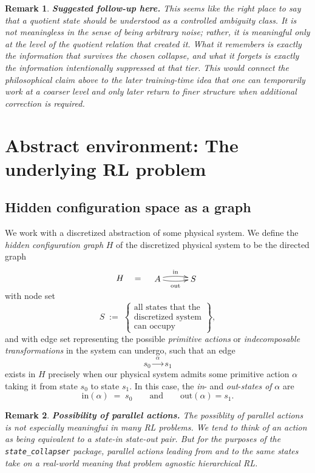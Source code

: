 \documentclass[11pt]{article}
\newtheorem{remark}{Remark}[subsection]
\begin{document}
{\color{blue}
\begin{remark}
{\bf Suggested follow-up here.}
\normalfont
This seems like the right place to say that a quotient state should be understood as a {\em controlled ambiguity class}. It is not meaningless in the sense of being arbitrary noise; rather, it is meaningful only at the level of the quotient relation that created it. What it remembers is exactly the information that survives the chosen collapse, and what it forgets is exactly the information intentionally suppressed at that tier. This would connect the philosophical claim above to the later training-time idea that one can temporarily work at a coarser level and only later return to finer structure when additional correction is required.
\end{remark}
}

\section{Abstract environment: The underlying RL problem}

\subsection{Hidden configuration space as a graph}
We work with a discretized abstraction of some physical system. We define the {\em hidden configuration graph} $H$ of the discretized physical system to be the directed graph
$$
H
\quad=\quad
\begin{xy}
(0,0)*+{A}="1";
(15,0)*+{S}="0";
{\ar@/^3pt/^{\text{in}} "1", "0"}
{\ar@/_3pt/_{\text{out}} "1", "0"}
\end{xy}
$$
with node set
$$
S\;:=\;\left\{\!\!
\begin{array}{c}
\text{all states that the}\\ \text{discretized system}\\ \text{can occupy}
\end{array}
\!\!\right\},
$$
and with edge set representing the possible {\em primitive actions} or {\em indecomposable transformations} in the system can undergo, such that an edge
$$
s_{0}\xrightarrow{\ \ \alpha\ \ }s_{1}
$$
exists in $H$ precisely when our physical system admits some primitive action $\alpha$ taking it from state $s_{0}$ to state $s_{1}$. In this case, the {\em in}- and {\em out}-{\em states of} $\alpha$ are
$$
\text{in}(\alpha)\;=\;s_{0}\quad\quad\text{and}\quad\quad\text{out}(\alpha)=s_{1}.
$$

\begin{remark}
{\bf Possibility of parallel actions.}
\normalfont
The possiblity of parallel actions is not especially meaningfui in many RL problems. We tend to think of an action as being equivalent to a state-in state-out pair. But for the purposes of the \texttt{state\_collapser} package, parallel actions leading from and to the same states take on a real-world meaning that problem agnostic hierarchical RL.
\end{remark}
\end{document}
